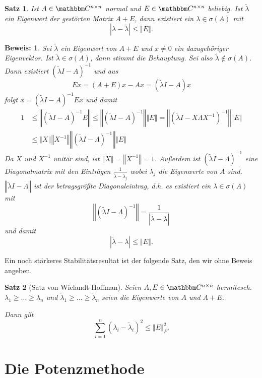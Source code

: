 \documentclass[12pt,a4paper]{book}
\theoremstyle{break}
\newtheorem{theorem}{Satz}[chapter]
\theoremstyle{nonumberplain}
\newtheorem{beweis}{Beweis:}
\newcommand{\C}{\mathbbm C}
\newcommand{\norm}[1]{\left\Vert#1\right\Vert}		%
\newcommand{\1}{\mathbbm{1}} 			      	%
\begin{document}
\begin{theorem}\label{thm:stabEW}
Ist $A\in \C^{n\times n}$ normal und $E\in \C^{n\times n}$ beliebig. Ist $\tilde \lambda$ ein Eigenwert der gestörten Matrix
$A+E$, dann existiert ein $\lambda\in \sigma(A)$ mit
\[
|\lambda-\tilde \lambda| \leq \norm{E}.
\]
\end{theorem}
\begin{beweis}
Sei $\tilde \lambda$ ein Eigenwert von $A+E$ und $x\neq 0$ ein dazugehöriger Eigenvektor.
Ist $\tilde \lambda\in \sigma(A)$, dann stimmt die Behauptung. Sei also $\tilde \lambda\not\in \sigma(A)$. Dann existiert $(\tilde \lambda I-A)^{-1}$ und
aus
\[
Ex=(A+E)x-Ax=(\tilde \lambda I - A)x
\]
folgt $x=(\tilde \lambda I - A)^{-1} Ex$ und damit
\begin{align*}
1 & \leq \norm{(\tilde \lambda I - A)^{-1} E} \leq \norm{(\tilde \lambda I - A)^{-1}} \norm{E}
= \norm{(\tilde \lambda I - X \Lambda X^{-1})^{-1}} \norm{E} \\
&\leq   \norm{X} \norm{X^{-1}} \norm{(\tilde \lambda I - \Lambda )^{-1}} \norm{E}
\end{align*}
Da $X$ und $X^{-1}$ unitär sind, ist $\norm{X}=\norm{X^{-1}}=1$. Außerdem ist 
$(\tilde\lambda I -\Lambda)^{-1}$ eine
Diagonalmatrix mit den Einträgen $\frac{1}{\tilde \lambda- \lambda_j}$ wobei $\lambda_j$ die Eigenwerte von $A$ sind.
$\norm{\tilde \lambda I -\Lambda}$ ist der betragsgrößte Diagonaleintrag, d.h. es existiert ein $\lambda\in \sigma(A)$ mit
\[
\norm{(\tilde \lambda I -\Lambda)^{-1}}=\frac{1}{|\tilde \lambda-\lambda|}
\]
und damit
\[
|\tilde \lambda-\lambda|\leq \norm{E}. 
\]
\phantom{ende}
\end{beweis}


Ein noch stärkeres Stabilitätsresultat ist der folgende Satz, den wir ohne Beweis angeben.
\begin{theorem}[Satz von Wielandt-Hoffman]
Seien $A,E\in \C^{n\times n}$ hermitesch. $\lambda_1\geq \ldots \geq \lambda_n$ und 
$\tilde \lambda_1\geq \ldots \geq \tilde \lambda_n$ seien die Eigenwerte von $A$ und $A+E$.

Dann gilt
\[
\sum_{i=1}^n (\lambda_i-\tilde \lambda_i)^2 \leq \norm{E}_F^2.
\]
\end{theorem}

\section{Die Potenzmethode}
\end{document}
